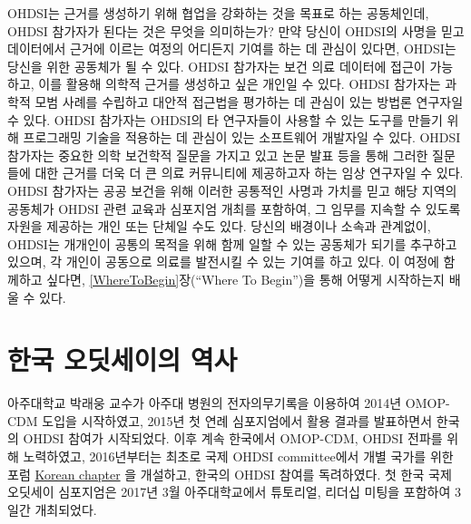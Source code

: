 \documentclass[11pt]{book}
\theoremstyle{definition}
\theoremstyle{definition}
\theoremstyle{definition}
\theoremstyle{remark}
\begin{document}
OHDSI는 근거를 생성하기 위해 협업을 강화하는 것을 목표로 하는
공동체인데, OHDSI 참가자가 된다는 것은 무엇을 의미하는가? 만약 당신이
OHDSI의 사명을 믿고 데이터에서 근거에 이르는 여정의 어디든지 기여를 하는
데 관심이 있다면, OHDSI는 당신을 위한 공동체가 될 수 있다. OHDSI
참가자는 보건 의료 데이터에 접근이 가능하고, 이를 활용해 의학적 근거를
생성하고 싶은 개인일 수 있다. OHDSI 참가자는 과학적 모범 사례를 수립하고
대안적 접근법을 평가하는 데 관심이 있는 방법론 연구자일 수 있다. OHDSI
참가자는 OHDSI의 타 연구자들이 사용할 수 있는 도구를 만들기 위해
프로그래밍 기술을 적용하는 데 관심이 있는 소프트웨어 개발자일 수 있다.
OHDSI 참가자는 중요한 의학 보건학적 질문을 가지고 있고 논문 발표 등을
통해 그러한 질문들에 대한 근거를 더욱 더 큰 의료 커뮤니티에 제공하고자
하는 임상 연구자일 수 있다. OHDSI 참가자는 공공 보건을 위해 이러한
공통적인 사명과 가치를 믿고 해당 지역의 공동체가 OHDSI 관련 교육과
심포지엄 개최를 포함하여, 그 임무를 지속할 수 있도록 자원을 제공하는
개인 또는 단체일 수도 있다. 당신의 배경이나 소속과 관계없이, OHDSI는
개개인이 공통의 목적을 위해 함께 일할 수 있는 공동체가 되기를 추구하고
있으며, 각 개인이 공동으로 의료를 발전시킬 수 있는 기여를 하고 있다. 이
여정에 함께하고 싶다면, \ref{WhereToBegin}장(``Where To Begin'')을 통해
어떻게 시작하는지 배울 수 있다.

\section{한국 오딧세이의 역사}\label{--}

아주대학교 박래웅 교수가 아주대 병원의 전자의무기록을 이용하여 2014년
OMOP-CDM 도입을 시작하였고, 2015년 첫 연례 심포지엄에서 활용 결과를
발표하면서 한국의 OHDSI 참여가 시작되었다. 이후 계속 한국에서 OMOP-CDM,
OHDSI 전파를 위해 노력하였고, 2016년부터는 최초로 국제 OHDSI
committee에서 개별 국가를 위한 포럼
\href{http://forums.ohdsi.org/c/For-collaborators-wishing-to-communicate-in-Korean}{Korean
chapter} 을 개설하고, 한국의 OHDSI 참여를 독려하였다. 첫 한국 국제
오딧세이 심포지엄은 2017년 3월 아주대학교에서 튜토리얼, 리더십 미팅을
포함하여 3일간 개최되었다.
\end{document}
